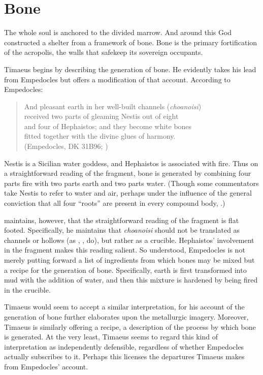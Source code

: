 
\section{Bone} %
\label{sec:bone}

The whole soul is anchored to the divided marrow. And around this God constructed a shelter from a framework of bone. Bone is the primary fortification of the acropolis, the walls that safekeep its sovereign occupants.

Timaeus begins by describing the generation of bone. He evidently takes his lead from Empedocles but offers a modification of that account. According to Empedocles:
\begin{verse}
	And pleasant earth in her well-built channels (\emph{choanoisi})\\
	received two parts of gleaming Nestis out of eight\\
	and four of Hephaistos; and they become white bones\\
	fitted together with the divine glues of harmony.\\
	(Empedocles, DK 31B96; \citealt[62 245]{Inwood:2001ve})
\end{verse}
Nestis is a Sicilian water goddess, and Hephaistos is associated with fire. Thus on a straightforward reading of the fragment, bone is generated by combining four parts fire with two parts earth and two parts water. (Though some commentators take Nestis to refer to water and air, perhaps under the influence of the general conviction that all four ``roots'' are present in every compound body, \citealt[209 n2]{Wright:1981zr}.) 

\citet[301-2]{Palmer:2009qf} maintains, however, that the straightforward reading of the fragment is flat footed. Specifically, he maintains that \emph{choanoisi} should not be translated as channels or hollows (as \citealt[151 n1]{Guthrie:1965ys}, \citealt[208--9]{Wright:1981zr}, \citealt[62 245]{Inwood:2001ve} do), but rather as a crucible. Hephaistos' involvement in the fragment makes this reading salient. So understood, Empedocles is not merely putting forward a list of ingredients from which bones may be mixed but a recipe for the generation of bone. Specifically, earth is first transformed into mud with the addition of water, and then this mixture is hardened by being fired in the crucible.

Timaeus would seem to accept a similar interpretation, for his account of the generation of bone further elaborates upon the metallurgic imagery. Moreover, Timaeus is similarly offering a recipe, a description of the process by which bone is generated. At the very least, Timaeus seems to regard this kind of interpretation as independently defensible, regardless of whether Empedocles actually subscribes to it. Perhaps this licenses the departures Timaeus makes from Empedocles' account. 

